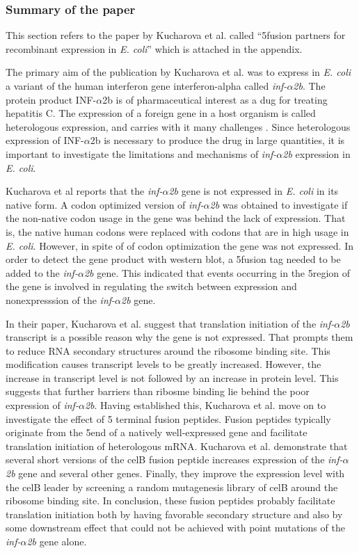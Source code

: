 %
\subsubsection{Summary of the paper}
This section refers to the paper by Kucharova et al. called ``5\p fusion
partners for recombinant expression in \textit{E. coli}'' which is attached in
the appendix.

The primary aim of the publication by Kucharova et al. was to express in
\textit{E. coli} a variant of the human interferon gene interferon-alpha called
\textit{inf-$\alpha$2b}. The protein product INF-$\alpha$2b is of
pharmaceutical interest as a dug for treating hepatitis C. The expression of a
foreign gene in a host organism is called heterologous expression, and carries
with it many challenges \cite{gustafsson_codon_2004}. Since heterologous
expression of INF-$\alpha$2b is necessary to produce the drug in large
quantities, it is important to investigate the limitations and mechanisms of
\textit{inf-$\alpha$2b} expression in \textit{E. coli}.

Kucharova et al reports that the \textit{inf-$\alpha$2b} gene is not
expressed in \textit{E.  coli} in its native form. A codon optimized version of
\textit{inf-$\alpha$2b} was obtained to investigate if the non-native codon
usage in the gene was behind the lack of expression. That is, the native human
codons were replaced with codons that are in high usage in \textit{E. coli}.
However, in spite of of codon optimization the gene was not expressed. In order
to detect the gene product with western blot, a 5\p fusion tag needed to be
added to the \textit{inf-$\alpha$2b} gene. This indicated that events occurring
in the 5\p region of the gene is involved in regulating the switch between
expression and nonexpresssion of the \textit{inf-$\alpha$2b} gene.

In their paper, Kucharova et al. suggest that translation initiation of the
\textit{inf-$\alpha$2b} transcript is a possible reason why the gene is not
expressed. That prompts them to reduce RNA secondary structures around the
ribosome binding site. This modification causes transcript levels to be greatly
increased. However, the increase in transcript level is not followed by an
increase in protein level. This suggests that further barriers than ribosme
binding lie behind the poor expression of \textit{inf-$\alpha$2b}. Having
established this, Kucharova et al. move on to investigate the effect of 5\p
terminal fusion peptides. Fusion peptides typically originate from the 5\p end
of a natively well-expressed gene and facilitate translation initiation of
heterologous mRNA. Kucharova et al. demonstrate that several short versions
of the celB fusion peptide increases expression of the \textit{inf-$\alpha$2b}
gene and several other genes. Finally, they improve the expression level with
the celB leader by screening a random mutagenesis library of celB around the
ribosome binding site. In conclusion, these fusion peptides probably facilitate
translation initiation both by having favorable secondary structure and also by
some downstream effect that could not be achieved with point mutations of the
\textit{inf-$\alpha$2b} gene alone.

